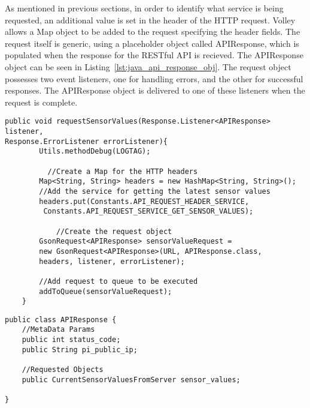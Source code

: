 \documentclass{article}
\begin{document}
\noindent
As mentioned in previous sections, in order to identify what service is being requested, an additional value is set in the header of the HTTP request. Volley allows a Map object to be added to the request specifying the header fields. The request itself is generic, using a placeholder object called APIResponse, which is populated when the response for the RESTful API is recieved. The APIResponse object can be seen in Listing~\ref{lst:java_api_response_obj}. The request object possesses two event listeners, one for handling errors, and the other for successful responses. The APIResponse object is delivered to one of these listeners when the request is complete. 

\begin{lstlisting}[caption={Java method API call for request latest sensor readings},label={lst:java_api_call}]
public void requestSensorValues(Response.Listener<APIResponse> listener,
Response.ErrorListener errorListener){
        Utils.methodDebug(LOGTAG);

	      //Create a Map for the HTTP headers
        Map<String, String> headers = new HashMap<String, String>();
        //Add the service for getting the latest sensor values
        headers.put(Constants.API_REQUEST_HEADER_SERVICE,
         Constants.API_REQUEST_SERVICE_GET_SENSOR_VALUES);

		    //Create the request object
        GsonRequest<APIResponse> sensorValueRequest = 
        new GsonRequest<APIResponse>(URL, APIResponse.class, 
        headers, listener, errorListener);
        
        //Add request to queue to be executed
        addToQueue(sensorValueRequest);
    }

\end{lstlisting}
\newpage

\begin{lstlisting}[caption={APIResponse class, used when parsing the RESTful API response},label={lst:java_api_response_obj}]
public class APIResponse {
    //MetaData Params
    public int status_code;
    public String pi_public_ip;

    //Requested Objects
    public CurrentSensorValuesFromServer sensor_values;

}
\end{lstlisting}	
\end{document}
